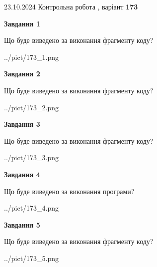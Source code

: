 \documentclass[12pt, ukrainian]{article}
\begin{document}
{\Large{23.10.2024 Контрольна робота , варіант  \No \textbf { 173 }\par}}
{
\begin {large}
{\begin {center}\textbf{Завдання 1}\end {center}}

Що буде виведено за виконання фрагменту коду?\par
\begin{center}
	{../pict/173_1.png}
\end{center}
\newpage

{\begin {center}\textbf{Завдання 2}\end {center}}

Що буде виведено за виконання фрагменту коду?\par
\begin{center}
	{../pict/173_2.png}
\end{center}
\newpage

{\begin {center}\textbf{Завдання 3}\end {center}}

Що буде виведено за виконання фрагменту коду?\par
\begin{center}
	{../pict/173_3.png}
\end{center}
\newpage

{\begin {center}\textbf{Завдання 4}\end {center}}

Що буде виведено за виконання програми?\par
\begin{center}
	{../pict/173_4.png}
\end{center}
\newpage

{\begin {center}\textbf{Завдання 5}\end {center}}

Що буде виведено за виконання фрагменту коду?\par
\begin{center}
	{../pict/173_5.png}
\end{center}
\newpage


\end{large}}
\end{document}
